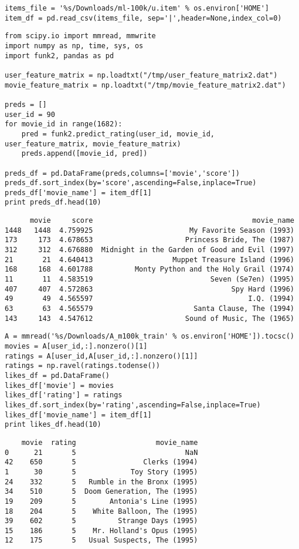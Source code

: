 \documentclass[12pt,fleqn]{article}\usepackage{../common}
\begin{document}
\begin{verbatim}
items_file = '%s/Downloads/ml-100k/u.item' % os.environ['HOME']
item_df = pd.read_csv(items_file, sep='|',header=None,index_col=0)
\end{verbatim}

\begin{verbatim}
from scipy.io import mmread, mmwrite
import numpy as np, time, sys, os
import funk2, pandas as pd

user_feature_matrix = np.loadtxt("/tmp/user_feature_matrix2.dat")
movie_feature_matrix = np.loadtxt("/tmp/movie_feature_matrix2.dat")

preds = []
user_id = 90
for movie_id in range(1682):
    pred = funk2.predict_rating(user_id, movie_id, user_feature_matrix, movie_feature_matrix)
    preds.append([movie_id, pred])

preds_df = pd.DataFrame(preds,columns=['movie','score'])
preds_df.sort_index(by='score',ascending=False,inplace=True)
preds_df['movie_name'] = item_df[1]
print preds_df.head(10)
\end{verbatim}

\begin{verbatim}
      movie     score                                      movie_name
1448   1448  4.759925                       My Favorite Season (1993)
173     173  4.678653                      Princess Bride, The (1987)
312     312  4.676880  Midnight in the Garden of Good and Evil (1997)
21       21  4.640413                   Muppet Treasure Island (1996)
168     168  4.601788          Monty Python and the Holy Grail (1974)
11       11  4.583519                            Seven (Se7en) (1995)
407     407  4.572863                                 Spy Hard (1996)
49       49  4.565597                                     I.Q. (1994)
63       63  4.565579                        Santa Clause, The (1994)
143     143  4.547612                      Sound of Music, The (1965)
\end{verbatim}

\begin{verbatim}
A = mmread('%s/Downloads/A_m100k_train' % os.environ['HOME']).tocsc()
movies = A[user_id,:].nonzero()[1]
ratings = A[user_id,A[user_id,:].nonzero()[1]]
ratings = np.ravel(ratings.todense())
likes_df = pd.DataFrame()
likes_df['movie'] = movies
likes_df['rating'] = ratings
likes_df.sort_index(by='rating',ascending=False,inplace=True)
likes_df['movie_name'] = item_df[1]
print likes_df.head(10)
\end{verbatim}

\begin{verbatim}
    movie  rating                   movie_name
0      21       5                          NaN
42    650       5                Clerks (1994)
1      30       5             Toy Story (1995)
24    332       5   Rumble in the Bronx (1995)
34    510       5  Doom Generation, The (1995)
19    209       5        Antonia's Line (1995)
18    204       5    White Balloon, The (1995)
39    602       5          Strange Days (1995)
15    186       5    Mr. Holland's Opus (1995)
12    175       5   Usual Suspects, The (1995)
\end{verbatim}
\end{document}
